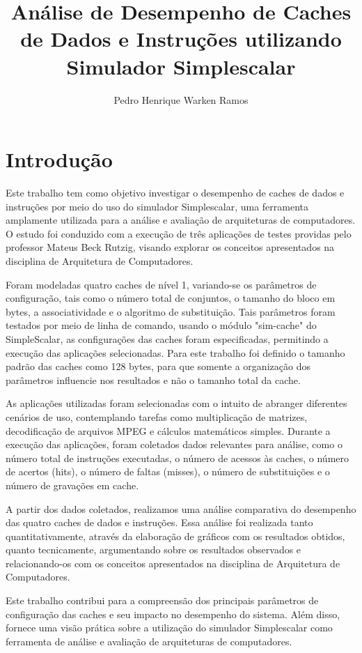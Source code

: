 \documentclass[12pt]{article}
\title{Análise de Desempenho de Caches de Dados e Instruções utilizando Simulador Simplescalar}
\author{Pedro Henrique Warken Ramos }
\begin{document}
 

\maketitle

\section{Introdução} \label{sec:introducao}

Este trabalho tem como objetivo investigar o desempenho de caches de dados e
instruções por meio do uso do simulador Simplescalar, uma ferramenta 
amplamente utilizada para a análise e avaliação de arquiteturas de 
computadores. O estudo foi conduzido com a execução de três aplicações de 
testes providas pelo professor Mateus Beck Rutzig, visando explorar os 
conceitos apresentados na disciplina de Arquitetura de Computadores.

Foram modeladas quatro caches de nível 1, variando-se os parâmetros de
configuração, tais como o número total de conjuntos, o 
tamanho do bloco em bytes, a associatividade e o algoritmo de substituição.
Tais parâmetros foram testados por meio de linha de comando, usando o módulo
"sim-cache" do SimpleScalar, as configurações das caches foram especificadas,
permitindo a execução das aplicações selecionadas. Para este trabalho foi
definido o tamanho padrão das caches como 128 bytes, para que somente a 
organização dos parâmetros influencie nos resultados e não o tamanho total da cache.

As aplicações utilizadas foram selecionadas com o intuito de abranger 
diferentes cenários de uso, contemplando tarefas como multiplicação de 
matrizes, decodificação de arquivos MPEG e cálculos matemáticos simples. 
Durante a execução das aplicações, foram coletados dados relevantes para 
análise, como o número total de instruções executadas, o número de acessos às 
caches, o número de acertos (hits), o número de faltas (misses), o número de 
substituições e o número de gravações em cache.

A partir dos dados coletados, realizamos uma análise comparativa do desempenho 
das quatro caches de dados e instruções. Essa análise foi realizada tanto 
quantitativamente, através da elaboração de gráficos com os resultados 
obtidos, quanto tecnicamente, argumentando sobre os resultados observados e 
relacionando-os com os conceitos apresentados na disciplina de Arquitetura de 
Computadores.

Este trabalho contribui para a compreensão dos principais parâmetros 
de configuração das caches e seu impacto no desempenho do sistema. 
Além disso, fornece uma visão prática sobre a utilização do simulador
Simplescalar como ferramenta de análise e avaliação de arquiteturas de
computadores.
\end{document}
